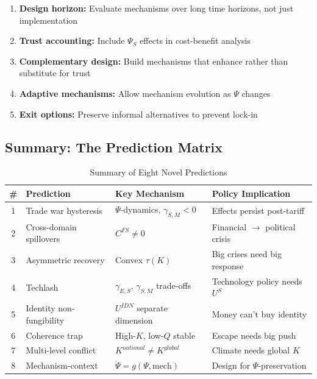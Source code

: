 \begin{enumerate}
  \item \textbf{Design horizon:} Evaluate mechanisms over long time horizons, not just implementation
  \item \textbf{Trust accounting:} Include $\Psi_S$ effects in cost-benefit analysis
  \item \textbf{Complementary design:} Build mechanisms that enhance rather than substitute for trust
  \item \textbf{Adaptive mechanisms:} Allow mechanism evolution as $\Psi$ changes
  \item \textbf{Exit options:} Preserve informal alternatives to prevent lock-in
\end{enumerate}

\subsection{Summary: The Prediction Matrix}

\begin{table}[htbp]
\centering
\caption{Summary of Eight Novel Predictions}
\label{tab:predictions-summary}
\small
\renewcommand{\arraystretch}{1.3}
\begin{tabular}{@{}clll@{}}
\toprule
\textbf{\#} & \textbf{Prediction} & \textbf{Key Mechanism} & \textbf{Policy Implication} \\
\midrule
1 & Trade war hysteresis & $\Psi$-dynamics, $\gamma_{S,M} < 0$ & Effects persist post-tariff \\
2 & Cross-domain spillovers & $C^{FS} \neq 0$ & Financial $\to$ political crisis \\
3 & Asymmetric recovery & Convex $\tau(K)$ & Big crises need big response \\
4 & Techlash & $\gamma_{E,S}$, $\gamma_{S,M}$ trade-offs & Technology policy needs $U^S$ \\
5 & Identity non-fungibility & $U^{IDN}$ separate dimension & Money can't buy identity \\
6 & Coherence trap & High-$K$, low-$Q$ stable & Escape needs big push \\
7 & Multi-level conflict & $K^{national} \neq K^{global}$ & Climate needs global $K$ \\
8 & Mechanism-context & $\dot{\Psi} = g(\Psi, \text{mech})$ & Design for $\Psi$-preservation \\
\bottomrule
\end{tabular}
\end{table}

